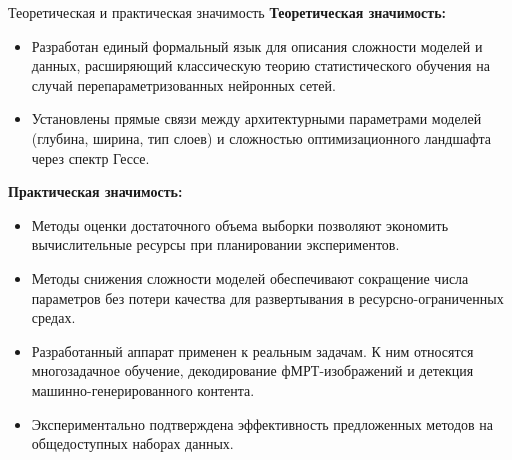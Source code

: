 \documentclass[10pt,pdf,hyperref={unicode}]{beamer}
\begin{document}
\begin{frame}{Теоретическая и практическая значимость}
\justifying
\small
\textbf{Теоретическая значимость:}
\begin{itemize}
    \justifying
    \item Разработан единый формальный язык для описания сложности моделей и данных, расширяющий классическую теорию статистического обучения на случай перепараметризованных нейронных сетей.
    \item Установлены прямые связи между архитектурными параметрами моделей (глубина, ширина, тип слоев) и сложностью оптимизационного ландшафта через спектр Гессе.
\end{itemize}

\vspace{0.2cm}
\textbf{Практическая значимость:}
\begin{itemize}
    \justifying
    \item Методы оценки достаточного объема выборки позволяют экономить вычислительные ресурсы при планировании экспериментов.
    \item Методы снижения сложности моделей обеспечивают сокращение числа параметров без потери качества для развертывания в ресурсно-ограниченных средах.
    \item Разработанный аппарат применен к реальным задачам. К ним относятся многозадачное обучение, декодирование фМРТ-изображений и детекция машинно-генерированного контента.
    \item Экспериментально подтверждена эффективность предложенных методов на общедоступных наборах данных.
\end{itemize}
\end{frame}
\end{document}
